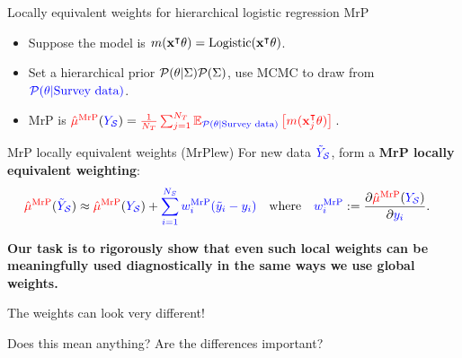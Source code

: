 
\begin{frame}[t]{Locally equivalent weights for hierarchical logistic regression MrP}
%
\vspace{-1em}
\begin{itemize}
    \item Suppose the model is $\m(\x^\trans \theta) = \mathrm{Logistic}(\x^\trans \theta)$.
    \item Set a hierarchical prior $\p(\theta \vert \Sigma)\p(\Sigma)$,
            use MCMC to draw from $\post$.
    \item MrP is $\muhatmrp = \tarcol{\meantar \expect{\post}{\m(\x_j^\trans \theta)}}$.
\end{itemize}
%
\vspace{4em}
    \begin{block}{MrP locally equivalent weights (MrPlew)}
    \centering
    \vspace{1em}
    For new data $\Ytil$, form a \textbf{MrP locally equivalent weighting}:
    $$
    \begin{aligned}
    \muhatmrp[\Ytil] \approx{}& \muhatmrp + \surcol{\sumsur \w_i^\mrp (\ytil_i - \y_i)}\quad
    \textrm{where}\quad \surcol{\w_i^\mrp} :={} \frac{\partial \muhatmrp}{\partial \surcol{\y_i}}.
    \end{aligned}
    $$
    \vspace{1em}
    \end{block}


\vspace{2em}
    \textbf{
        Our task is to rigorously show that even such local weights can be meaningfully
        used diagnostically in the same ways we use global weights.
     }



\end{frame}




\begin{frame}{The weights can look very different!}

    \centering
    Does this mean anything?  Are the differences important?

    \AlexanderWeightPlot{}
\end{frame}


